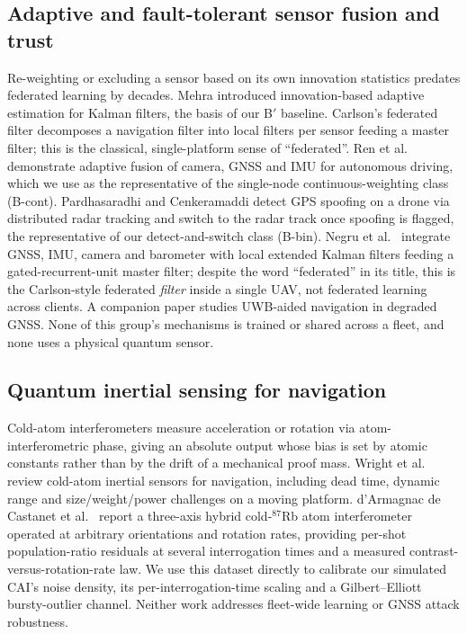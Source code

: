 \documentclass[12pt,a4paper]{article}
\begin{document}
\subsection{Adaptive and fault-tolerant sensor fusion and trust}
Re-weighting or excluding a sensor based on its own innovation statistics predates federated learning by decades. Mehra \cite{mehra1970identification} introduced innovation-based adaptive estimation for Kalman filters, the basis of our B$'$ baseline. Carlson's federated filter \cite{carlson1988federated,carlson1990federated} decomposes a navigation filter into local filters per sensor feeding a master filter; this is the classical, single-platform sense of ``federated''. Ren et al.\ \cite{ren2020adaptive} demonstrate adaptive fusion of camera, GNSS and IMU for autonomous driving, which we use as the representative of the single-node continuous-weighting class (B-cont). Pardhasaradhi and Cenkeramaddi \cite{pardhasaradhi2022gps} detect GPS spoofing on a drone via distributed radar tracking and switch to the radar track once spoofing is flagged, the representative of our detect-and-switch class (B-bin). Negru et al.\ \cite{negru2024resilient} integrate GNSS, IMU, camera and barometer with local extended Kalman filters feeding a gated-recurrent-unit master filter; despite the word ``federated'' in its title, this is the Carlson-style federated \emph{filter} inside a single UAV, not federated learning across clients. A companion paper \cite{negru2024uwb} studies UWB-aided navigation in degraded GNSS. None of this group's mechanisms is trained or shared across a fleet, and none uses a physical quantum sensor.

\subsection{Quantum inertial sensing for navigation}
Cold-atom interferometers measure acceleration or rotation via atom-interferometric phase, giving an absolute output whose bias is set by atomic constants rather than by the drift of a mechanical proof mass. Wright et al.\ \cite{wright2022cold} review cold-atom inertial sensors for navigation, including dead time, dynamic range and size/weight/power challenges on a moving platform. d'Armagnac de Castanet et al.\ \cite{darmagnac2024atom} report a three-axis hybrid cold-$^{87}$Rb atom interferometer operated at arbitrary orientations and rotation rates, providing per-shot population-ratio residuals at several interrogation times and a measured contrast-versus-rotation-rate law. We use this dataset \cite{darmagnac2024dataset} directly to calibrate our simulated CAI's noise density, its per-interrogation-time scaling and a Gilbert--Elliott bursty-outlier channel. Neither work addresses fleet-wide learning or GNSS attack robustness.
\end{document}
